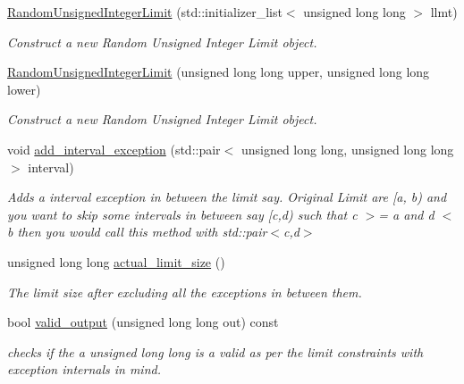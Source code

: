 \begin{DoxyCompactItemize}
\item 
\hyperlink{classtestcaser_1_1maker_1_1RandomUnsignedIntegerLimit_a8535b952828f59d17c69caae62f4c4e1}{Random\+Unsigned\+Integer\+Limit} (std\+::initializer\+\_\+list$<$ unsigned long long $>$ llmt)
\begin{DoxyCompactList}\small\item\em Construct a new Random Unsigned Integer Limit object. \end{DoxyCompactList}\item 
\hyperlink{classtestcaser_1_1maker_1_1RandomUnsignedIntegerLimit_a4299cc026c1ed26b595c248c6e243f8c}{Random\+Unsigned\+Integer\+Limit} (unsigned long long upper, unsigned long long lower)
\begin{DoxyCompactList}\small\item\em Construct a new Random Unsigned Integer Limit object. \end{DoxyCompactList}\item 
void \hyperlink{classtestcaser_1_1maker_1_1RandomUnsignedIntegerLimit_a979b5384118ab1f3c20366ae3e9bff7a}{add\+\_\+interval\+\_\+exception} (std\+::pair$<$ unsigned long long, unsigned long long $>$ interval)
\begin{DoxyCompactList}\small\item\em Adds a interval exception in between the limit say. Original Limit are \mbox{[}a, b) and you want to skip some intervals in between say \mbox{[}c,d) such that c $>$= a and d $<$ b then you would call this method with std\+::pair$<$c,d$>$ \end{DoxyCompactList}\item 
unsigned long long \hyperlink{classtestcaser_1_1maker_1_1RandomUnsignedIntegerLimit_a8235c0a24e918b66eafdfb4987d3258a}{actual\+\_\+limit\+\_\+size} ()
\begin{DoxyCompactList}\small\item\em The limit size after excluding all the exceptions in between them. \end{DoxyCompactList}\item 
bool \hyperlink{classtestcaser_1_1maker_1_1RandomUnsignedIntegerLimit_af38fd933b010cd1877e012ed40b2cafa}{valid\+\_\+output} (unsigned long long out) const
\begin{DoxyCompactList}\small\item\em checks if the a unsigned long long is a valid as per the limit constraints with exception internals in mind. \end{DoxyCompactList}\end{DoxyCompactItemize}
